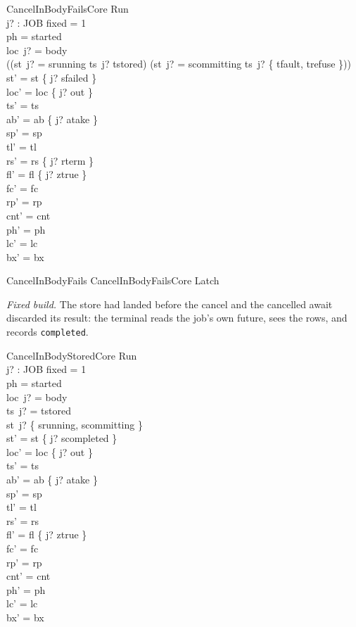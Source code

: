 \documentclass[a4paper,10pt,fleqn]{article}
\newcommand{\field}[1]{\texttt{#1}}
\begin{document}
\begin{schema}{CancelInBodyFailsCore}
\Delta Run \\ j? : JOB
\where
fixed = 1 \\
ph = started \\
loc~j? = body \\
((st~j? = srunning \land ts~j? \neq tstored) \lor (st~j? = scommitting \land ts~j? \in \{ tfault, trefuse \})) \\
st' = st \oplus \{ j? \mapsto sfailed \} \\
loc' = loc \oplus \{ j? \mapsto out \} \\
ts' = ts \\
ab' = ab \oplus \{ j? \mapsto atake \} \\
sp' = sp \\
tl' = tl \\
rs' = rs \oplus \{ j? \mapsto rterm \} \\
fl' = fl \oplus \{ j? \mapsto ztrue \} \\
fc' = fc \\
rp' = rp \\
cnt' = cnt \\
ph' = ph \\
lc' = lc \\
bx' = bx
\end{schema}

\begin{zed}
CancelInBodyFails  CancelInBodyFailsCore \land Latch
\end{zed}

\emph{Fixed build.} The store had landed before the cancel and the cancelled
await discarded its result: the terminal reads the job's own future, sees the
rows, and records \field{completed}.

\begin{schema}{CancelInBodyStoredCore}
\Delta Run \\ j? : JOB
\where
fixed = 1 \\
ph = started \\
loc~j? = body \\
ts~j? = tstored \\
st~j? \in \{ srunning, scommitting \} \\
st' = st \oplus \{ j? \mapsto scompleted \} \\
loc' = loc \oplus \{ j? \mapsto out \} \\
ts' = ts \\
ab' = ab \oplus \{ j? \mapsto atake \} \\
sp' = sp \\
tl' = tl \\
rs' = rs \\
fl' = fl \oplus \{ j? \mapsto ztrue \} \\
fc' = fc \\
rp' = rp \\
cnt' = cnt \\
ph' = ph \\
lc' = lc \\
bx' = bx
\end{schema}
\end{document}
